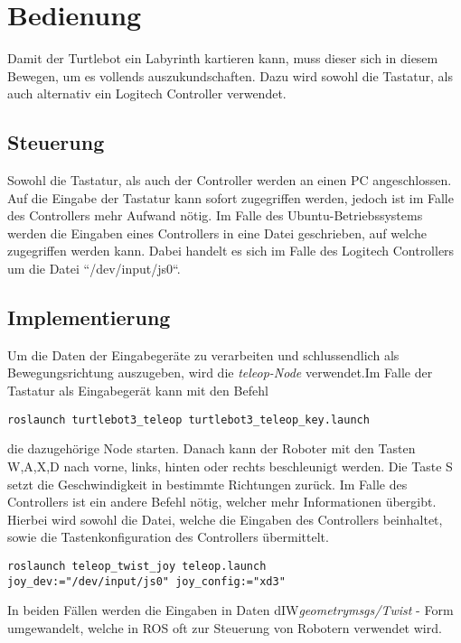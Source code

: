 \section{Bedienung}
{
	Damit der Turtlebot ein Labyrinth kartieren kann, muss dieser sich in diesem Bewegen, um es vollends auszukundschaften. Dazu wird sowohl die Tastatur, als auch alternativ ein Logitech Controller verwendet.
	
	\subsection{Steuerung}
	{
		Sowohl die Tastatur, als auch der Controller werden an einen PC angeschlossen. Auf die Eingabe der Tastatur kann sofort zugegriffen werden, jedoch ist im Falle des Controllers mehr Aufwand nötig. Im Falle des Ubuntu-Betriebssystems werden die Eingaben eines Controllers in eine Datei geschrieben, auf welche zugegriffen werden kann. Dabei handelt es sich im Falle des Logitech Controllers um die Datei ``/dev/input/js0``.
	}

	\subsection{Implementierung}
	{ Um die Daten der Eingabegeräte zu verarbeiten und schlussendlich als Bewegungsrichtung auszugeben, wird die \textit{teleop-Node} verwendet.Im Falle der Tastatur als Eingabegerät kann mit den Befehl 
		\begin{lstlisting}
roslaunch turtlebot3_teleop turtlebot3_teleop_key.launch
		\end{lstlisting}
	die dazugehörige Node starten. Danach kann der Roboter mit den Tasten W,A,X,D nach vorne, links,  hinten oder rechts beschleunigt werden. Die Taste S setzt die Geschwindigkeit in bestimmte Richtungen zurück.
	\newline
	Im Falle des Controllers ist ein andere Befehl nötig, welcher mehr Informationen übergibt. Hierbei wird sowohl die Datei, welche die Eingaben des Controllers beinhaltet, sowie die Tastenkonfiguration des Controllers übermittelt.
	\begin{lstlisting}
roslaunch teleop_twist_joy teleop.launch 
joy_dev:="/dev/input/js0" joy_config:="xd3"
	\end{lstlisting}
	
	In beiden Fällen werden die Eingaben in Daten dIW\textit{geometry\textunderscore msgs/Twist} - Form umgewandelt, welche in ROS  oft zur Steuerung von Robotern verwendet wird.
	}
}
